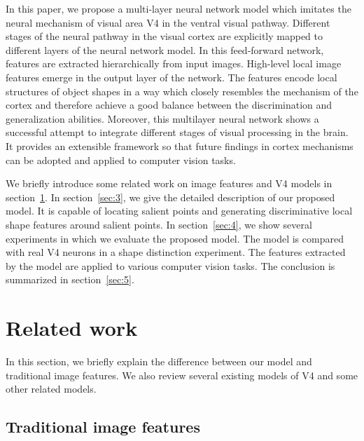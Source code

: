 \documentclass[10pt]{article}
\begin{document}
In this paper, we propose a multi-layer neural network model which imitates the neural mechanism of visual area V4 in the ventral visual pathway.
Different stages of the neural pathway in the visual cortex are explicitly mapped to different layers of the neural network model.
In this feed-forward network, features are extracted hierarchically from input images. 
High-level local image features emerge in the output layer of the network. 
The features encode local structures of object shapes in a way which closely resembles the mechanism of the cortex 
and therefore achieve a good balance between the discrimination and generalization abilities.
Moreover, this multilayer neural network shows a successful attempt to integrate different stages of visual processing in the brain. 
It provides an extensible framework so that future findings in cortex mechanisms can be adopted and applied to computer vision tasks.

We briefly introduce some related work on image features and V4 models in section~\ref{sec:2}.
In section~\ref{sec:3}, we give the detailed description of our proposed model.
It is capable of locating salient points and generating discriminative local shape features around salient points.
In section~\ref{sec:4}, we show several experiments in which we evaluate the proposed model.
The model is compared with real V4 neurons in a shape distinction experiment.
The features extracted by the model are applied to various computer vision tasks.
The conclusion is summarized in section~\ref{sec:5}.

\section{Related work}\label{sec:2}

In this section, we briefly explain the difference between our model and traditional image features.
We also review several existing models of V4 and some other related models.

\subsection{Traditional image features}
\end{document}
